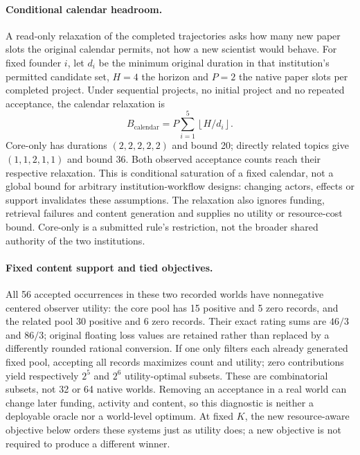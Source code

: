 \paragraph{Conditional calendar headroom.}
A read-only relaxation of the completed trajectories asks how many new paper
slots the original calendar permits, not how a new scientist would behave.
For fixed founder $i$, let $d_i$ be the minimum original duration in that
institution's permitted candidate set, $H=4$ the horizon and $P=2$ the native
paper slots per completed project. Under sequential projects, no initial
project and no repeated acceptance, the calendar relaxation is
\begin{equation}
 B_{\mathrm{calendar}}=P\sum_{i=1}^{5}\left\lfloor H/d_i\right\rfloor.
\end{equation}
Core-only has durations $(2,2,2,2,2)$ and bound 20; directly related topics
give $(1,1,2,1,1)$ and bound 36. Both observed acceptance counts reach their
respective relaxation. This is conditional saturation of a fixed calendar,
not a global bound for arbitrary institution-workflow designs: changing
actors, effects or support invalidates these assumptions. The relaxation
also ignores funding, retrieval failures and content generation and supplies
no utility or resource-cost bound. Core-only is a submitted rule's restriction,
not the broader shared authority of the two institutions.

\paragraph{Fixed content support and tied objectives.}
All 56 accepted occurrences in these two recorded worlds have nonnegative
centered observer utility: the core pool has 15 positive and 5 zero records,
and the related pool 30 positive and 6 zero records. Their exact rating sums
are $46/3$ and $86/3$; original floating loss values are retained rather than
replaced by a differently rounded rational conversion. If one only filters
each already generated fixed pool, accepting all records maximizes count and
utility; zero contributions yield respectively $2^5$ and $2^6$ utility-optimal
subsets. These are combinatorial subsets, not 32 or 64 native worlds. Removing
an acceptance in a real world can change later funding, activity and content,
so this diagnostic is neither a deployable oracle nor a world-level optimum.
At fixed $K$, the new resource-aware objective below orders these systems just
as utility does; a new objective is not required to produce a different winner.


